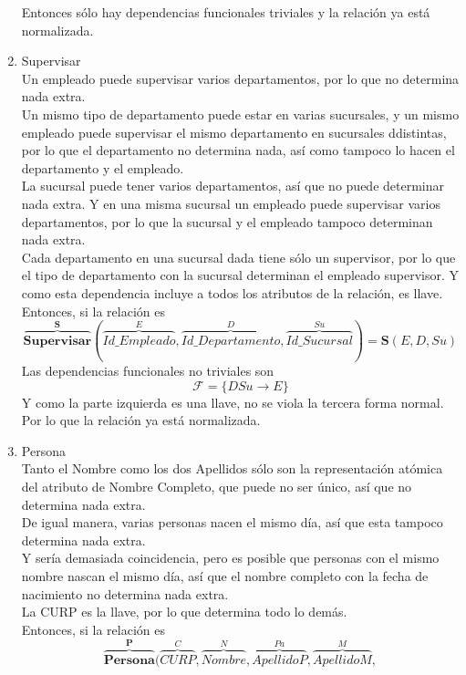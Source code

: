 \documentclass[10pt]{article}
\begin{document}
\begin{enumerate}
	Entonces sólo hay dependencias funcionales triviales y la relación ya está
	normalizada.
	\item Supervisar \\
	Un empleado puede supervisar varios departamentos, por lo que no determina nada
	extra.\\
	Un mismo tipo de departamento puede estar en varias sucursales, y un mismo
	empleado puede supervisar el mismo departamento en sucursales ddistintas,
	por lo que el departamento no determina nada, así como tampoco lo hacen el 
	departamento y el empleado.\\
	La sucursal puede tener varios departamentos, así que no puede determinar
	nada extra. Y en una misma sucursal un empleado puede supervisar varios
	departamentos, por lo que la sucursal y el empleado tampoco determinan nada
	extra.\\
	Cada departamento en una sucursal dada tiene sólo un supervisor, por lo que 
	el tipo de departamento con la sucursal determinan el empleado supervisor.
	Y como esta dependencia incluye a todos los atributos de la relación, es
	llave.\\
	Entonces, si la relación es 
	\[\overbrace{{\textbf{Supervisar}}}^{\textbf{S}} 
	(
		\overbrace{Id\_Empleado}^{E}, \overbrace{Id\_Departamento}^{D},
		\overbrace{Id\_Sucursal}^{Su}
	 )
	 = 
	 \textbf{S}(E, D, Su)
	 \]
	 Las dependencias funcionales no triviales son 
	 \[\mathcal{F} = \{DSu \rightarrow E\}\]
	 Y como la parte izquierda es una llave, no se viola la tercera forma normal.\\
	 Por lo que la relación ya está normalizada.
	\item Persona \\
	Tanto el Nombre como los dos Apellidos sólo son la representación atómica del
	atributo de Nombre Completo, que puede no ser único, así que no determina
	nada extra.\\
	De igual manera, varias personas nacen el mismo día, así que esta tampoco
	determina nada extra.\\
	Y sería demasiada coincidencia, pero es posible que personas con el mismo
	nombre nascan el mismo día, así que el nombre completo con la fecha de 
	nacimiento no determina nada extra.\\
	La CURP es la llave, por lo que determina todo lo demás.\\
	Entonces, si la relación es 
	\[\overbrace{{\textbf{Persona}}}^{\textbf{P}} 
   (
	   \overbrace{CURP}^{C}, \overbrace{Nombre}^{N}, 
	   \overbrace{Apellido P}^{Pa}, \overbrace{Apellido M}^{M},
\]
\end{enumerate}
\end{document}

